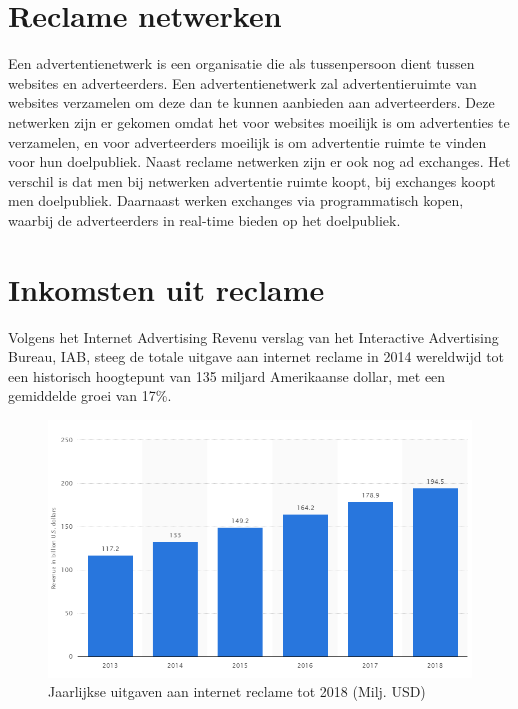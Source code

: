 \documentclass[pdftex,a4paper,12pt,twoside]{report}
\begin{document}
\section{Reclame netwerken}
\label{sec:Reclame netwerken}
Een advertentienetwerk is een organisatie die als tussenpersoon dient tussen websites en adverteerders. Een advertentienetwerk zal advertentieruimte van websites verzamelen om deze dan te kunnen aanbieden aan adverteerders. Deze netwerken zijn er gekomen omdat het voor websites moeilijk is om advertenties te verzamelen, en voor adverteerders moeilijk is om advertentie ruimte te vinden voor hun doelpubliek. Naast reclame netwerken zijn er ook nog ad exchanges. Het verschil is dat men bij netwerken advertentie ruimte koopt, bij exchanges koopt men doelpubliek. Daarnaast werken exchanges via programmatisch kopen, waarbij de adverteerders in real-time bieden op het doelpubliek.


\section{Inkomsten uit reclame}
\label{sec:Inkomsten uit reclame}
Volgens het Internet Advertising Revenu verslag \cite{Silverman2015} van het Interactive Advertising Bureau, IAB, steeg de totale uitgave aan internet reclame in 2014 wereldwijd tot een historisch hoogtepunt van 135 miljard Amerikaanse dollar, met een gemiddelde groei van 17\%.

\begin{figure}[h!]
\centering
\includegraphics[width=12cm]{img/AdvertisingRevenueYearly}
\caption{ Jaarlijkse uitgaven aan internet reclame tot 2018 (Milj. USD)}
\label{fig: AdvertisingRevenueYearly}
\end{figure} 
\end{document}
